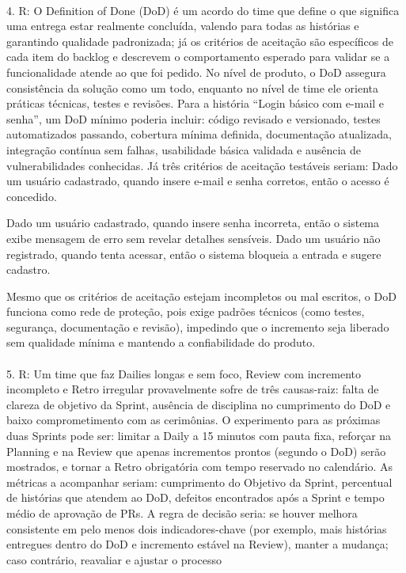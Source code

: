 \documentclass[12pt,a4paper]{article}
\begin{document}
\paragraph{}

4. R: O Definition of Done (DoD) é um acordo do time que define o que significa uma entrega
estar realmente concluída, valendo para todas as histórias e garantindo qualidade
padronizada; já os critérios de aceitação são específicos de cada item do backlog e
descrevem o comportamento esperado para validar se a funcionalidade atende ao que foi
pedido. No nível de produto, o DoD assegura consistência da solução como um todo,
enquanto no nível de time ele orienta práticas técnicas, testes e revisões.
Para a história “Login básico com e-mail e senha”, um DoD mínimo poderia incluir: código
revisado e versionado, testes automatizados passando, cobertura mínima definida,
documentação atualizada, integração contínua sem falhas, usabilidade básica validada e
ausência de vulnerabilidades conhecidas. Já três critérios de aceitação testáveis seriam:
Dado um usuário cadastrado, quando insere e-mail e senha corretos, então o acesso é
concedido.

Dado um usuário cadastrado, quando insere senha incorreta, então o sistema exibe
mensagem de erro sem revelar detalhes sensíveis.
Dado um usuário não registrado, quando tenta acessar, então o sistema bloqueia a entrada
e sugere cadastro.

Mesmo que os critérios de aceitação estejam incompletos ou mal escritos, o DoD funciona
como rede de proteção, pois exige padrões técnicos (como testes, segurança,
documentação e revisão), impedindo que o incremento seja liberado sem qualidade mínima
e mantendo a confiabilidade do produto.

\paragraph{}

5. R: Um time que faz Dailies longas e sem foco, Review com incremento incompleto e Retro
irregular provavelmente sofre de três causas-raiz: falta de clareza de objetivo da Sprint,
ausência de disciplina no cumprimento do DoD e baixo comprometimento com as
cerimônias. O experimento para as próximas duas Sprints pode ser: limitar a Daily a 15
minutos com pauta fixa, reforçar na Planning e na Review que apenas incrementos prontos
(segundo o DoD) serão mostrados, e tornar a Retro obrigatória com tempo reservado no
calendário. As métricas a acompanhar seriam: cumprimento do Objetivo da Sprint,
percentual de histórias que atendem ao DoD, defeitos encontrados após a Sprint e tempo
médio de aprovação de PRs. A regra de decisão seria: se houver melhora consistente em
pelo menos dois indicadores-chave (por exemplo, mais histórias entregues dentro do DoD e
incremento estável na Review), manter a mudança; caso contrário, reavaliar e ajustar o
processo
\end{document}

